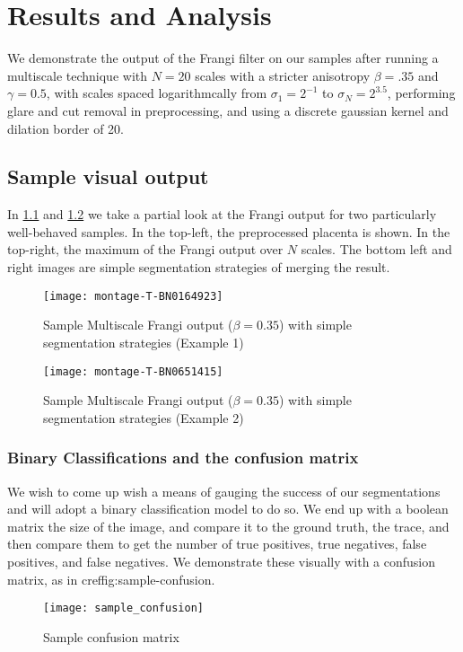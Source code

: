 \chapter{Results and Analysis} \label{ch:results-analysis}

We demonstrate the output of the Frangi filter on our samples after running a multiscale technique with $N=20$ scales with a stricter anisotropy $\beta = .35$ and $\gamma=0.5$,
with scales spaced logarithmcally from $\sigma_1 = 2^{-1}$ to $\sigma_N = 2^{3.5}$, performing glare and cut removal in preprocessing, and using a discrete gaussian kernel and dilation border of 20.

\section{Sample visual output}
In \cref{fig:output-montage-example1} and \cref{fig:output-montage-example2} we take a partial look at the Frangi output for two particularly well-behaved samples. In the top-left, the preprocessed placenta is shown. In the top-right, the maximum of the Frangi output over $N$ scales. The bottom left and right images are simple segmentation strategies of merging the result.

\begin{figure} \centering
  \texttt{[image: montage-T-BN0164923]}
  \caption{Sample Multiscale Frangi output ($\beta=0.35$) with simple segmentation strategies (Example 1)}
  \label{fig:output-montage-example1}
\end{figure}

\begin{figure} \centering
  \texttt{[image: montage-T-BN0651415]}
  \caption{Sample Multiscale Frangi output ($\beta=0.35$) with simple segmentation strategies (Example 2)}
  \label{fig:output-montage-example2}
\end{figure}


\subsection{Binary Classifications and the confusion matrix}

We wish to come up wish a means of gauging the success of our segmentations and will adopt a binary classification model to do so.
We end up with a boolean matrix the size of the image, and compare it to the ground truth, the trace, and then compare them to get the number of true positives, true negatives, false positives, and false negatives. We demonstrate these visually with a confusion matrix, as in cref{fig:sample-confusion}.
\begin{figure}
	\centering
	\texttt{[image: sample\_confusion]}
	\caption{Sample confusion matrix}
	\label{fig:sample-confusion}

\end{figure}
	
